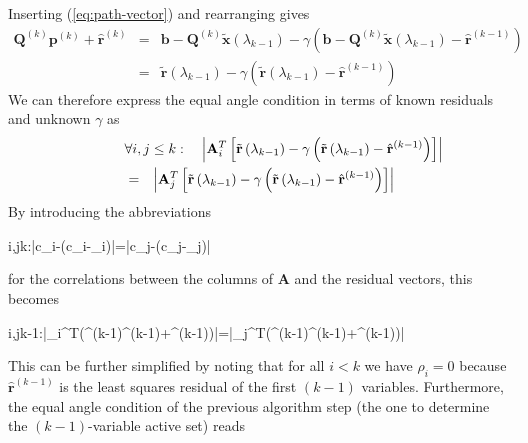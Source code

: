 Inserting (\ref{eq:path-vector}) and rearranging gives
\begin{eqnarray*}
\mathbf{Q}^{(k)}\mathbf{p}^{(k)}+\hat{\mathbf{r}}^{(k)} & = & \mathbf{b}-\mathbf{Q}^{(k)}\tilde{\mathbf{x}}\left(\lambda_{k-1}\right)-\gamma\left(\mathbf{b}-\mathbf{Q}^{(k)}\tilde{\mathbf{x}}\left(\lambda_{k-1}\right)-\hat{\mathbf{r}}^{(k-1)}\right)\\
 & = & \tilde{\mathbf{r}}\left(\lambda_{k-1}\right)-\gamma\left(\tilde{\mathbf{r}}\left(\lambda_{k-1}\right)-\hat{\mathbf{r}}^{(k-1)}\right)
\end{eqnarray*}
We can therefore express the equal angle condition in terms of known
residuals and unknown $\gamma$ as
\begin{eqnarray*}
\lefteqn{\forall i,j\le k:\quad\left|\mathbf{A}_{i}^{T}\left[\tilde{\mathbf{r}}\left(\lambda_{k-1}\right)-\gamma\left(\tilde{\mathbf{r}}\left(\lambda_{k-1}\right)-\hat{\mathbf{r}}^{(k-1)}\right)\right]\right|}\\
 & = & \left|\mathbf{A}_{j}^{T}\left[\tilde{\mathbf{r}}\left(\lambda_{k-1}\right)-\gamma\left(\tilde{\mathbf{r}}\left(\lambda_{k-1}\right)-\hat{\mathbf{r}}^{(k-1)}\right)\right]\right|
\end{eqnarray*}
By introducing the abbreviations



\forall i,j\le k:\quad\left|c_{i}-\gamma\left(c_{i}-\rho_{i}\right)\right|=\left|c_{j}-\gamma\left(c_{j}-\rho_{j}\right)\right|


for the correlations between the columns of $\mathbf{A}$ and the
residual vectors, this becomes



\forall i,j\le k-1:\quad\left|_{i}^{T}\left(^{(k-1)}^{(k-1)}+^{(k-1)}\right)\right|=\left|_{j}^{T}\left(^{(k-1)}^{(k-1)}+^{(k-1)}\right)\right|


This can be further simplified by noting that for all $i<k$ we have
$\rho_{i}=0$ because $\hat{\mathbf{r}}^{(k-1)}$ is the least squares
residual of the first $\left(k-1\right)$ variables. Furthermore,
the equal angle condition of the previous algorithm step (the one
to determine the $\left(k-1\right)$-variable active set) reads


